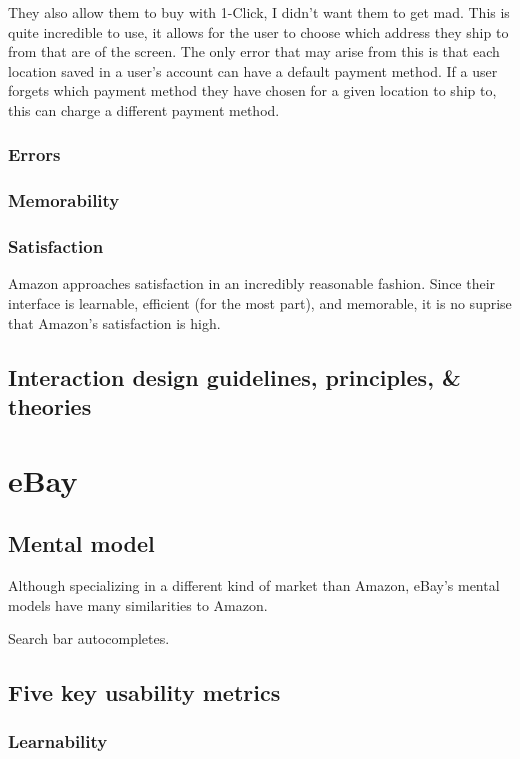\documentclass[11pt, oneside]{article}
\begin{document}
They also allow them to buy with 1-Click\textregistered, I didn't want them to get mad. This is quite incredible to use, it allows for the user to choose which address they ship to from that are of the screen. The only error that may arise from this is that each location saved in a user's account can have a default payment method. If a user forgets which payment method they have chosen for a given location to ship to, this can charge a different payment method.

\subsubsection{Errors}

\subsubsection{Memorability}
\subsubsection{Satisfaction}
Amazon approaches satisfaction in an incredibly reasonable fashion. Since their interface is learnable, efficient (for the most part), and memorable, it is no suprise that Amazon's satisfaction is high.


\subsection{Interaction design guidelines, principles, \& theories}

\pagebreak

\section{eBay}

\subsection{Mental model}

Although specializing in a different kind of market than Amazon, eBay's mental models have many similarities to Amazon.

Search bar autocompletes.

\subsection{Five key usability metrics}
\subsubsection{Learnability}
\end{document}
